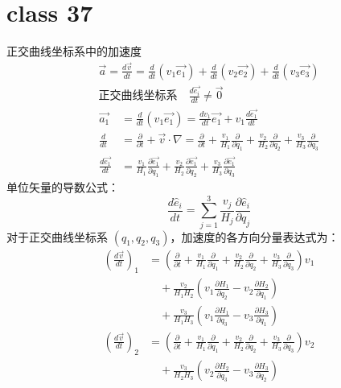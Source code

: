 \documentclass[12pt, a4paper, oneside, UTF8]{ctexbook}  %
\newcommand{\pa}{\partial}
\begin{document}
\section{class 37}
\begin{defn}
    正交曲线坐标系中的加速度
    \begin{gather*}
        \vec{a}=\frac{d\vec{v}}{dt}=\frac{d}{dt}(v_1\vec{e_1})+\frac{d}{dt}(v_2\vec{e_2})
        +\frac{d}{dt}(v_3\vec{e_3})\\
        \text{正交}\text{曲线坐标系}\quad\frac{d\vec{e_i}}{dt}\neq\vec{0}
    \end{gather*}
    \begin{align*}
        \vec{a_1}&=\frac{d}{dt}(v_1\vec{e_1})=\frac{dv_1}{dt}\vec{e_1}
        +v_1\frac{d\vec{e_1}}{dt}\\
        \frac{d}{dt}&=\frac{\pa}{\pa t}+\vec{v}\cdot\nabla
        =\frac{\pa}{\pa t}+\frac{v_1}{H_1}\frac{\pa}{\pa q_1}
        +\frac{v_2}{H_2}\frac{\pa}{\pa q_2}+\frac{v_3}{H_3}\frac{\pa}{\pa q_3}\\
        \frac{d\vec{e_1}}{dt}&=\frac{v_1}{H_1}\frac{\pa\vec{e_1}}{\pa q_1}
        +\frac{v_2}{H_2}\frac{\pa\vec{e_1}}{\pa q_2}+\frac{v_3}{H_3}\frac{\pa\vec{e_1}}{\pa q_3}
    \end{align*}
    单位矢量的导数公式：
\[
\frac{d\hat{e}_i}{dt} = \sum_{j=1}^3 \frac{v_j}{H_j} \frac{\partial \hat{e}_i}{\partial q_j}
\]
    对于正交曲线坐标系 \( (q_1, q_2, q_3) \)，加速度的各方向分量表达式为：
\begin{align*}
\left(\frac{d\vec{v}}{dt}\right)_1 &=
    \left(\frac{\partial}{\partial t} + \frac{v_1}{H_1}\frac{\partial}{\partial q_1}
    + \frac{v_2}{H_2}\frac{\partial}{\partial q_2} + \frac{v_3}{H_3}\frac{\partial}{\partial q_3}
\right)v_1 \\&\quad+ \frac{v_2}{H_1 H_2}\left(v_1 \frac{\partial H_1}{\partial q_2} - v_2 \frac{\partial H_2}{\partial q_1}\right)
\\&\quad+ \frac{v_3}{H_1 H_3}\left(v_1 \frac{\partial H_1}{\partial q_3} - v_3 \frac{\partial H_3}{\partial q_1}\right)
\end{align*}
\begin{align*}
    \left(\frac{d\vec{v}}{dt}\right)_2 &=
        \left(\frac{\partial}{\partial t} + \frac{v_1}{H_1}\frac{\partial}{\partial q_1}
        + \frac{v_2}{H_2}\frac{\partial}{\partial q_2} + \frac{v_3}{H_3}\frac{\partial}{\partial q_3}
    \right)v_2 \\&\quad+ \frac{v_3}{H_2 H_3}\left(v_2 \frac{\partial H_2}{\partial q_3} - v_3 \frac{\partial H_3}{\partial q_2}\right)

\end{align*}
\end{defn}
\end{document}
